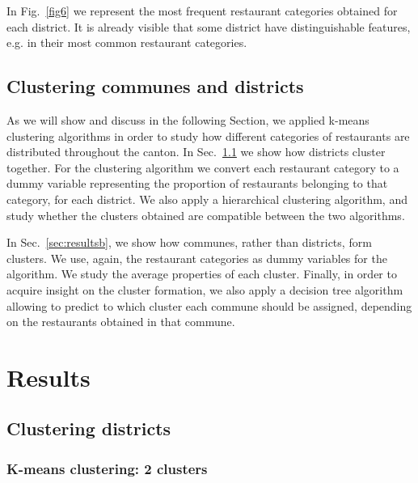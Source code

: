 \documentclass[12pt]{article}
\begin{document}
In Fig.~\ref{fig6} we represent the most frequent restaurant categories obtained for each district. It is already visible that some district have distinguishable features, e.g. in their most common restaurant categories.


\subsection{Clustering communes and districts}
As we will show and discuss in the following Section, we applied k-means clustering algorithms in order to study how different categories of restaurants are distributed throughout the canton. In Sec.~\ref{sec:resultsa} we show how districts cluster together. For the clustering algorithm we convert each restaurant category to a dummy variable representing the proportion of restaurants belonging to that category, for each district. We also apply a hierarchical clustering algorithm, and study whether the clusters obtained are compatible between the two algorithms. 

In Sec.~\ref{sec:resultsb}, we show how communes, rather than districts, form clusters. We use, again, the restaurant categories as dummy variables for the algorithm. We study the average properties of each cluster. Finally, in order to acquire insight on the cluster formation, we also apply a decision tree algorithm allowing to predict to which cluster each commune should be assigned, depending on the restaurants obtained in that commune. 

\section{Results}\label{sec:results}

\subsection{Clustering districts}
\label{sec:resultsa}

\subsubsection{K-means clustering: 2 clusters}
\end{document}
